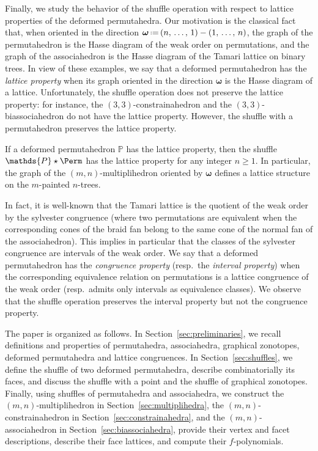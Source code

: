\documentclass[AHL,Unicode,longabstracts,published]{cedram}
\renewcommand{\b}[1]{\boldsymbol{#1}}
\newcommand{\eqdef}{\mbox{\,\raisebox{0.2ex}{\scriptsize\ensuremath{\mathrm:}}\ensuremath{=}\,}}
\newcommand{\shuffleDP}{\star} %
\newcommand{\polytope}[1]{\mathds{#1}}
\begin{document}
Finally, we study the behavior of the shuffle operation with respect to lattice properties of the deformed permutahedra. Our motivation is the classical fact that, when oriented in the direction $\b{\omega} \eqdef (n,\,\dots,\,1) - (1,\,\dots,\,n)$, the graph of the permutahedron is the Hasse diagram of the weak order on permutations, and the graph of the associahedron is the Hasse diagram of the Tamari lattice on binary trees. In view of these examples, we say that a deformed permutahedron has the
\emph{lattice property} when its graph oriented in the direction $\b{\omega}$ is the Hasse diagram of a lattice. Unfortunately, the shuffle operation does not preserve the lattice property: for instance, the \mbox{$(3,3)$-constrainahedron} and the $(3,3)$-biassociahedron do not have the lattice property. However, the shuffle with a permutahedron preserves the lattice property.

\begin{prop}
If a deformed permutahedron $\polytope{P}$ has the lattice property, then the shuffle ${\polytope{P} \shuffleDP \Perm}$ has the lattice property for any integer $n \ge 1$. In particular, the graph of the $(m,n)$-multiplihedron oriented by $\b{\omega}$ defines a lattice structure on the $m$-painted $n$-trees.
\end{prop}

In fact, it is well-known that the Tamari lattice is the quotient of the weak order by the sylvester congruence (where two permutations are equivalent when the corresponding cones of the braid fan belong to the same cone of the normal fan of the associahedron). This implies in particular that the classes of the sylvester congruence are intervals of the weak order. We say that a deformed permutahedron has the
\emph{congruence property} (resp.~the
\emph{interval property}) when the corresponding equivalence relation on permutations is a lattice congruence of the weak order (resp.~admits only intervals as equivalence classes). We observe that the shuffle operation preserves the interval property but not the congruence property.

The paper is organized as follows. In Section~\ref{sec:preliminaries}, we recall definitions and properties of permutahedra, associahedra, graphical zonotopes, deformed permutahedra and lattice congruences. In Section~\ref{sec:shuffles}, we define the shuffle of two deformed permutahedra, describe combinatorially its faces, and discuss the shuffle with a point and the shuffle of graphical zonotopes. Finally, using shuffles of permutahedra and associahedra, we construct the $(m,n)$-multiplihedron in Section~\ref{sec:multiplihedra}, the $(m,n)$-constrainahedron in Section~\ref{sec:constrainahedra}, and the $(m,n)$-associahedron in Section~\ref{sec:biassociahedra}, provide their vertex and facet descriptions, describe their face lattices, and compute their $f$-polynomials.
\end{document}
